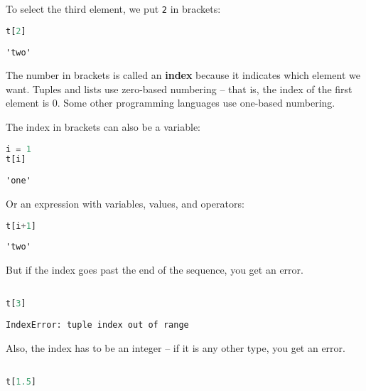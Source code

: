 To select the third element, we put \passthrough{\lstinline!2!} in
brackets:

\begin{lstlisting}[language=Python,style=source]
t[2]
\end{lstlisting}

\begin{lstlisting}[style=output]
'two'
\end{lstlisting}

The number in brackets is called an \textbf{index} because it indicates
which element we want. Tuples and lists use zero-based numbering -- that
is, the index of the first element is 0. Some other programming
languages use one-based numbering.

The index in brackets can also be a variable:

\begin{lstlisting}[language=Python,style=source]
i = 1
t[i]
\end{lstlisting}

\begin{lstlisting}[style=output]
'one'
\end{lstlisting}

Or an expression with variables, values, and operators:

\begin{lstlisting}[language=Python,style=source]
t[i+1]
\end{lstlisting}

\begin{lstlisting}[style=output]
'two'
\end{lstlisting}

But if the index goes past the end of the sequence, you get an error.

\begin{lstlisting}[language=Python,style=source]
%%expect IndexError

t[3]
\end{lstlisting}

\begin{lstlisting}[style=output]
IndexError: tuple index out of range
\end{lstlisting}

Also, the index has to be an integer -- if it is any other type, you get
an error.

\begin{lstlisting}[language=Python,style=source]
%%expect TypeError

t[1.5]
\end{lstlisting}

